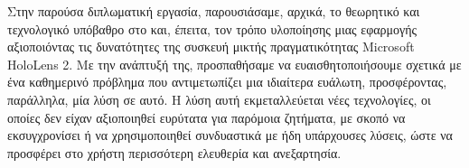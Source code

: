 Στην παρούσα διπλωματική εργασία, παρουσιάσαμε, αρχικά, το θεωρητικό και τεχνολογικό υπόβαθρο στο και, έπειτα, τον τρόπο υλοποίησης μιας εφαρμογής αξιοποιόντας τις δυνατότητες της συσκευή μικτής πραγματικότητας Microsoft HoloLens 2. Με την ανάπτυξή της, προσπαθήσαμε να ευαισθητοποιήσουμε σχετικά με ένα καθημερινό πρόβλημα που αντιμετωπίζει μια ιδιαίτερα ευάλωτη, προσφέροντας, παράλληλα, μία λύση σε αυτό. Η λύση αυτή εκμεταλλεύεται νέες τεχνολογίες, οι οποίες δεν είχαν αξιοποιηθεί ευρύτατα για παρόμοια ζητήματα, με σκοπό να εκσυγχρονίσει ή να χρησιμοποιηθεί συνδυαστικά με ήδη υπάρχουσες λύσεις, ώστε να προσφέρει στο χρήστη περισσότερη ελευθερία και ανεξαρτησία.  